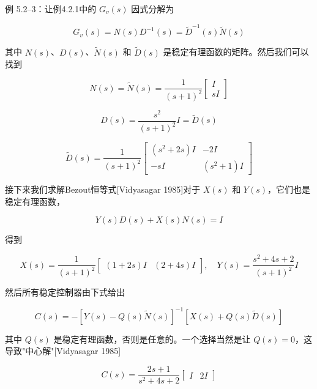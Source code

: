 \documentclass[UTF8,12pt,a4paper]{ctexart}
\begin{document}
\begin{example}
例 5.2--3：让例4.2.1中的 $G_v(s)$ 因式分解为

\begin{equation*}
G_v(s) = N(s)D^{-1}(s) = \tilde{D}^{-1}(s)\tilde{N}(s)
\end{equation*}

其中 $N(s)$、$D(s)$、$\tilde{N}(s)$ 和 $\tilde{D}(s)$ 是稳定有理函数的矩阵。然后我们可以找到

\begin{equation*}
N(s) = \tilde{N}(s) = \frac{1}{(s+1)^2}\begin{bmatrix} I \\ sI \end{bmatrix}
\end{equation*}

\begin{equation*}
D(s) = \frac{s^2}{(s+1)^2}I = \tilde{D}(s)
\end{equation*}

\begin{equation*}
\tilde{D}(s) = \frac{1}{(s+1)^2}\begin{bmatrix} (s^2+2s)I & -2I \\ -sI & (s^2+1)I \end{bmatrix}
\end{equation*}

接下来我们求解Bezout恒等式[Vidyasagar 1985]对于 $X(s)$ 和 $Y(s)$，它们也是稳定有理函数，

\begin{equation*}
Y(s)D(s) + X(s)N(s) = I
\end{equation*}

得到

\begin{equation*}
X(s) = \frac{1}{(s+1)^2}\begin{bmatrix} (1+2s)I & (2+4s)I \end{bmatrix}, \quad Y(s) = \frac{s^2+4s+2}{(s+1)^2}I
\end{equation*}

然后所有稳定控制器由下式给出

\begin{equation*}
C(s) = -[Y(s) - Q(s)\tilde{N}(s)]^{-1}[X(s) + Q(s)\tilde{D}(s)]
\end{equation*}

其中 $Q(s)$ 是稳定有理函数，否则是任意的。一个选择当然是让 $Q(s) = 0$，这导致"中心解"[Vidyasagar 1985]

\begin{equation*}
C(s) = \frac{2s+1}{s^2+4s+2}\begin{bmatrix} I & 2I \end{bmatrix}
\end{equation*}


\end{example}
\end{document}
